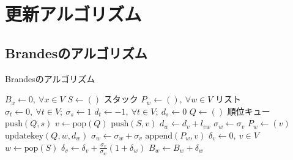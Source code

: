 \chapter{更新アルゴリズム}
\label{chap:app-algorithm}

\section{Brandesのアルゴリズム}
\label{sect:app-brandes-algorithm}
\begin{algorithm}[H]
  \caption{Brandesのアルゴリズム}
  \label{algo:brandes-algorithm}
  \begin{multicols}{2}
    \begin{algorithmic}[1]
      \State $B_x\gets 0,\:\forall x\in V$
      \State $S\gets()$ \Comment スタック
      \State $P_w\gets (),\:\forall w\in V$ \Comment リスト
      \State $\sigma_t\gets 0,\:\forall t\in V;\:\sigma_s\gets 1$
      \State $d_t\gets -1,\:\forall t\in V;\:d_s\gets 0$
      \State $Q\gets ()$ \Comment 順位キュー
      \State $\mathrm{push}(Q, s)$
      \State $v\gets\mathrm{pop}(Q)$
      \State $\mathrm{push}(S, v)$
      \State $d_w\gets d_v+l_{vw}$
      \State $\sigma_w\gets\sigma_v$
      \State $P_w\gets(v)$
      \State $\mathrm{updatekey}(Q, w, d_w)$
      \EndIf
      \State $\sigma_w\gets\sigma_w+\sigma_v$
      \State $\mathrm{append}(P_w, v)$
      \EndIf
      \EndFor
      \EndWhile
      \State $\delta_v\gets 0,\:v\in V$
      \State $w\gets\mathrm{pop}(S)$
      \State $\delta_v\gets\delta_v+\frac{\sigma_v}{\sigma_w}(1+\delta_w)$
      \EndFor
      \State $B_w\gets B_w+\delta_w$
      \EndIf
      \EndWhile
      \EndFor
      \EndProcedure
    \end{algorithmic}
  \end{multicols}
\end{algorithm}

